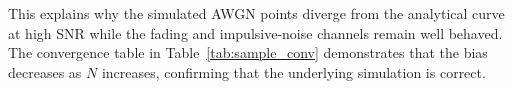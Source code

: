 \documentclass[12pt,a4paper]{article}
\begin{document}
This explains why the simulated AWGN points diverge from the analytical curve at high SNR while the fading and impulsive-noise channels remain well behaved. The convergence table in Table~\ref{tab:sample_conv} demonstrates that the bias decreases as $N$ increases, confirming that the underlying simulation is correct.
\end{document}
